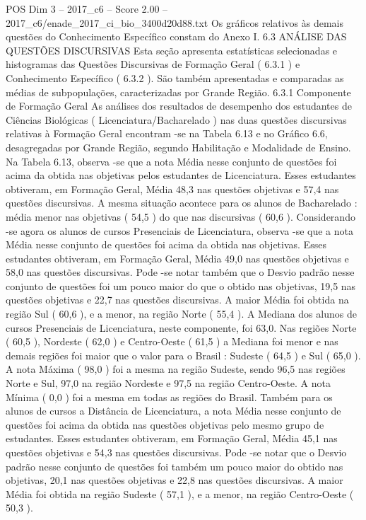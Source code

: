 \begin{textsample}{POS Dim 3 – 2017\_c6 – Score 2.00 – 2017\_c6/enade\_2017\_ci\_bio\_3400d20d88.txt}
Os gráficos relativos às demais questões do Conhecimento Específico constam do Anexo I. 6.3 ANÁLISE DAS QUESTÕES DISCURSIVAS Esta seção apresenta estatísticas selecionadas e histogramas das Questões Discursivas de Formação Geral ( 6.3.1 ) e Conhecimento Específico ( 6.3.2 ).
São também apresentadas e comparadas as médias de subpopulações, caracterizadas por Grande Região. 6.3.1 Componente de Formação Geral As análises dos resultados de desempenho dos estudantes de Ciências Biológicas ( Licenciatura/Bacharelado ) nas duas questões discursivas relativas à Formação Geral encontram -se na Tabela 6.13 e no Gráfico 6.6, desagregadas por Grande Região, segundo Habilitação e Modalidade de Ensino.
Na Tabela 6.13, observa -se que a nota Média nesse conjunto de questões foi acima da obtida nas objetivas pelos estudantes de Licenciatura.
Esses estudantes obtiveram, em Formação Geral, Média 48,3 nas questões objetivas e 57,4 nas questões discursivas.
A mesma situação acontece para os alunos de Bacharelado : média menor nas objetivas ( 54,5 ) do que nas discursivas ( 60,6 ).
Considerando -se agora os alunos de cursos Presenciais de Licenciatura, observa -se que a nota Média nesse conjunto de questões foi acima da obtida nas objetivas.
Esses estudantes obtiveram, em Formação Geral, Média 49,0 nas questões objetivas e 58,0 nas questões discursivas.
Pode -se notar também que o Desvio padrão nesse conjunto de questões foi um pouco maior do que o obtido nas objetivas, 19,5 nas questões objetivas e 22,7 nas questões discursivas.
A maior Média foi obtida na região Sul ( 60,6 ), e a menor, na região Norte ( 55,4 ).
A Mediana dos alunos de cursos Presenciais de Licenciatura, neste componente, foi 63,0.
Nas regiões Norte ( 60,5 ), Nordeste ( 62,0 ) e Centro-Oeste ( 61,5 ) a Mediana foi menor e nas demais regiões foi maior que o valor para o Brasil : Sudeste ( 64,5 ) e Sul ( 65,0 ).
A nota Máxima ( 98,0 ) foi a mesma na região Sudeste, sendo 96,5 nas regiões Norte e Sul, 97,0 na região Nordeste e 97,5 na região Centro-Oeste.
A nota Mínima ( 0,0 ) foi a mesma em todas as regiões do Brasil.
Também para os alunos de cursos a Distância de Licenciatura, a nota Média nesse conjunto de questões foi acima da obtida nas questões objetivas pelo mesmo grupo de estudantes.
Esses estudantes obtiveram, em Formação Geral, Média 45,1 nas questões objetivas e 54,3 nas questões discursivas.
Pode -se notar que o Desvio padrão nesse conjunto de questões foi também um pouco maior do obtido nas objetivas, 20,1 nas questões objetivas e 22,8 nas questões discursivas.
A maior Média foi obtida na região Sudeste ( 57,1 ), e a menor, na região Centro-Oeste ( 50,3 ).

\end{textsample}
